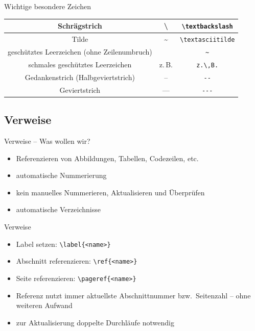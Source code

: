 \documentclass[presentation,aspectratio=169]{beamer}
\begin{document}
\begin{frame}[fragile]{Wichtige besondere Zeichen}
  \begin{tabular}{c|c|c}
    Schrägstrich                                  & \textbackslash   & \verb|\textbackslash| \\
    \hline
    Tilde                                         & \textasciitilde  & \verb|\textasciitilde| \\
    \hline
    geschütztes Leerzeichen (ohne Zeilenumbruch)  & ~                & \verb|~| \\
    \hline
    schmales geschütztes Leerzeichen              & z.\,B.           & \verb|z.\,B.| \\
    \hline
    Gedankenstrich (Halbgeviertstrich)            & --               & \verb|--| \\
    \hline
    Geviertstrich                                 & ---              & \verb|---|
  \end{tabular}
\end{frame}

\subsection{Verweise}

\begin{frame}{Verweise -- Was wollen wir?}
  \begin{itemize}
    \item Referenzieren von Abbildungen, Tabellen, Codezeilen, etc.
    \item automatische Nummerierung
    \item kein manuelles Nummerieren, Aktualisieren und Überprüfen
    \item automatische Verzeichnisse
  \end{itemize}
\end{frame}

\begin{frame}[fragile]{Verweise}
  \begin{itemize}
    \item Label setzen: \verb|\label{<name>}|
    \item Abschnitt referenzieren: \verb|\ref{<name>}|
    \item Seite referenzieren: \verb|\pageref{<name>}|
    \item Referenz nutzt immer aktuellste Abschnittnummer bzw.~Seitenzahl -- ohne weiteren Aufwand
    \item zur Aktualisierung doppelte Durchläufe notwendig
  \end{itemize}
\end{frame}
\end{document}
